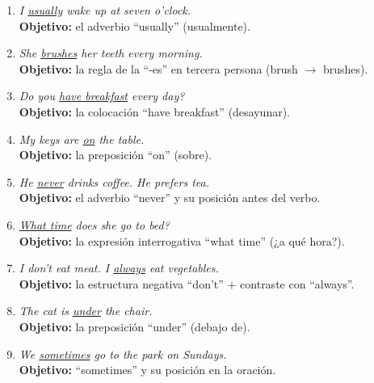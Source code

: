 \documentclass[12pt,a4paper]{article}
\begin{document}
\begin{cajamineria}

\begin{enumerate}[leftmargin=1.2cm]
  \item \textit{I \underline{usually} wake up at seven o'clock.}\\
    {\small\textbf{Objetivo:} el adverbio ``usually'' (usualmente).}

  \item \textit{She \underline{brushes} her teeth every morning.}\\
    {\small\textbf{Objetivo:} la regla de la ``-es'' en tercera persona (brush $\rightarrow$ brushes).}

  \item \textit{Do you \underline{have breakfast} every day?}\\
    {\small\textbf{Objetivo:} la colocación ``have breakfast'' (desayunar).}

  \item \textit{My keys are \underline{on} the table.}\\
    {\small\textbf{Objetivo:} la preposición ``on'' (sobre).}

  \item \textit{He \underline{never} drinks coffee. He prefers tea.}\\
    {\small\textbf{Objetivo:} el adverbio ``never'' y su posición antes del verbo.}

  \item \textit{\underline{What time} does she go to bed?}\\
    {\small\textbf{Objetivo:} la expresión interrogativa ``what time'' (¿a qué hora?).}

  \item \textit{I don't eat meat. I \underline{always} eat vegetables.}\\
    {\small\textbf{Objetivo:} la estructura negativa ``don't'' + contraste con ``always''.}

  \item \textit{The cat is \underline{under} the chair.}\\
    {\small\textbf{Objetivo:} la preposición ``under'' (debajo de).}

  \item \textit{We \underline{sometimes} go to the park on Sundays.}\\
    {\small\textbf{Objetivo:} ``sometimes'' y su posición en la oración.}


\end{enumerate}
\end{cajamineria}
\end{document}
